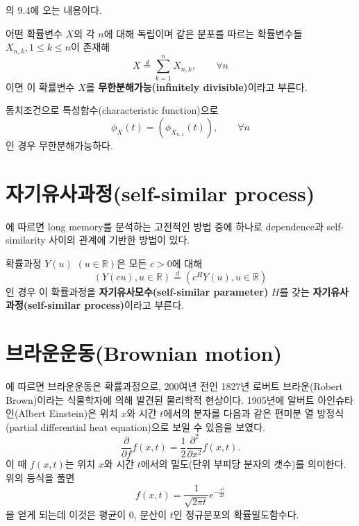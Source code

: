 \documentclass[b5paper,]{scrbook}
\theoremstyle{plain}
\theoremstyle{definition}
\numberwithin{equation}{section}
\let\BeginKnitrBlock\begin \let\EndKnitrBlock\end
\begin{document}
\citep{Gut2012}의 9.4에 오는 내용이다.

\BeginKnitrBlock{definition}[무한분해가능 분포]
\protect\hypertarget{def:unnamed-chunk-160}{}{\label{def:unnamed-chunk-160} {} }어떤 확률변수 \(X\)의 각 \(n\)에 대해 독립이며 같은 분포를 따르는 확률변수들 \(X_{n,k},1\leq k \leq n\)이 존재해
\[X\stackrel{d}{=}\sum_{k=1}^{n} X_{n,k}, \qquad{\forall n}\]
이면 이 확률변수 \(X\)를 \textbf{무한분해가능(infinitely divisible)}이라고 부른다.

동치조건으로 특성함수(characteristic function)으로
\[\phi_{X}(t) = (\phi_{X_{n,1}}(t)), \qquad{\forall n}\]
인 경우 무한분해가능하다.
\EndKnitrBlock{definition}

\hypertarget{self-similar-process}{%
\section{자기유사과정(self-similar process)}\label{self-similar-process}}

\citep{Beran2013}에 따르면 long memory를 분석하는 고전적인 방법 중에 하나로 dependence과 self-similarity 사이의 관계에 기반한 방법이 있다.

\BeginKnitrBlock{definition}[자기유사과정]
\protect\hypertarget{def:unnamed-chunk-161}{}{\label{def:unnamed-chunk-161} {} }확률과정 \(Y(u)\) \((u\in \mathbb{R})\)은 모든 \(c>0\)에 대해
\[(Y(cu),u\in\mathbb{R})\stackrel{d}{=}(c^{H}Y(u), u\in\mathbb{R})\]
인 경우 이 확률과정을 \textbf{자기유사모수(self-similar parameter)} \(H\)를 갖는 \textbf{자기유사과정(self-similar process)}이라고 부른다.
\EndKnitrBlock{definition}

\hypertarget{brownian-motion}{%
\section{브라운운동(Brownian motion)}\label{brownian-motion}}

\citep{Mikhail2014}에 따르면 브라운운동은 확률과정으로, 200여년 전인 1827년 로버트 브라운(Robert Brown)이라는 식물학자에 의해 발견된 물리학적 현상이다. 1905년에 알버트 아인슈타인(Albert Einstein)은 위치 \(x\)와 시간 \(t\)에서의 분자를 다음과 같은 편미분 열 방정식(partial differential heat equation)으로 보일 수 있음을 보였다.
\[\frac{\partial}{\partial f}f(x,t) = \frac{1}{2}\frac{\partial^2}{\partial x^2}f(x,t).\]
이 때 \(f(x,t)\)는 위치 \(x\)와 시간 \(t\)에서의 밀도(단위 부피당 분자의 갯수)를 의미한다. 위의 등식을 풀면
\[f(x,t) = \frac{1}{\sqrt{2\pi t}}e^{-\frac{x^2}{2t}}\]
을 얻게 되는데 이것은 평균이 0, 분산이 \(t\)인 정규분포의 확률밀도함수다.
\end{document}
